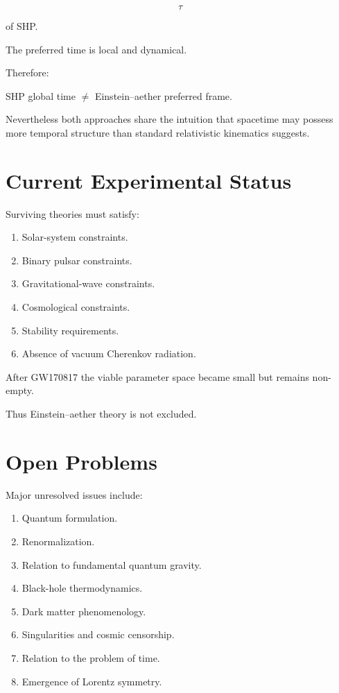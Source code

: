 \begin{equation}
\tau
\end{equation}

of SHP.

The preferred time is local and dynamical.

Therefore:

\begin{center}
SHP global time
$\neq$
Einstein--aether preferred frame.
\end{center}

Nevertheless both approaches share the intuition that spacetime
may possess more temporal structure than standard relativistic
kinematics suggests.

\section{Current Experimental Status}

Surviving theories must satisfy:

\begin{enumerate}
\item Solar-system constraints.
\item Binary pulsar constraints.
\item Gravitational-wave constraints.
\item Cosmological constraints.
\item Stability requirements.
\item Absence of vacuum Cherenkov radiation.
\end{enumerate}

After GW170817 the viable parameter space became small but remains
non-empty.

Thus Einstein--aether theory is not excluded.

\section{Open Problems}

Major unresolved issues include:

\begin{enumerate}
\item Quantum formulation.
\item Renormalization.
\item Relation to fundamental quantum gravity.
\item Black-hole thermodynamics.
\item Dark matter phenomenology.
\item Singularities and cosmic censorship.
\item Relation to the problem of time.
\item Emergence of Lorentz symmetry.
\end{enumerate}

